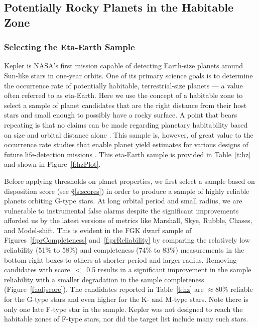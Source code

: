 \label{s:hz}
\subsection{Potentially Rocky Planets in the Habitable Zone}

\subsubsection{Selecting the Eta-Earth Sample}
Kepler is NASA's first mission capable of detecting Earth-size planets around Sun-like stars in one-year orbits.  One of its primary science goals is to determine the occurrence rate of potentially habitable, terrestrial-size planets --- a value often referred to as eta-Earth.  Here we use the concept of a habitable zone to select a sample of planet candidates that are the right distance from their host stars and small enough to possibly have a rocky surface. A point that bears repeating is that no claims can be made regarding planetary habitability based on size and orbital distance alone \citep{Kane2012,Tasker2017}.   This sample is, however, of great value to the occurrence rate studies that enable planet yield estimates for various designs of future life-detection missions \citep{stark2015}. This eta-Earth sample is provided in Table~\ref{t:hz} and shown in Figure~\ref{f:hzPlot}.


Before applying thresholds on planet properties, we first select a sample based on disposition score (see \S\ref{s:scores}) in order to produce a sample of highly reliable planets orbiting G-type stars. At long orbital period and small radius, we are vulnerable to instrumental false alarms despite the significant improvements afforded us by the latest versions of metrics like Marshall, Skye, Rubble, Chases, and Model-shift. This is evident in the FGK dwarf sample of Figures~\ref{f:prCompleteness} and~\ref{f:prReliability} by comparing the relatively low reliability (51\% to 58\%) and completeness (74\% to 83\%) measurements in the bottom right boxes to others at shorter period and larger radius.  Removing candidates with score~$<$~0.5 results in a significant improvement in the sample reliability with a smaller degradation in the sample completeness (Figure~\ref{f:adjscore}).  The candidates reported in Table~\ref{t:hz} are $\approx$80\% reliable for the G-type stars and even higher for the K- and M-type stars. Note there is only one late F-type star in the sample.  Kepler was not designed to reach the habitable zones of F-type stars, nor did the target list include many such stars.


